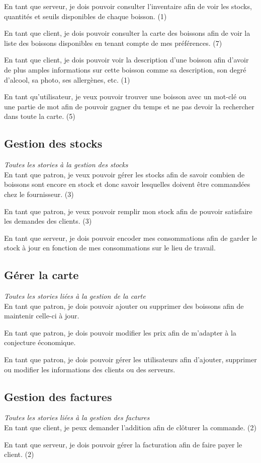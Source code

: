 \documentclass[10pt, a4, oneside, headings=normal]{scrartcl}
\begin{document}
En tant que serveur, je dois pouvoir consulter l'inventaire afin de voir les stocks, quantités et seuils disponibles de chaque boisson. (1)

En tant que client, je dois pouvoir consulter la carte des boissons afin de voir la liste des boissons disponibles en tenant compte de mes préférences. (7)

En tant que client, je dois pouvoir voir la description d'une boisson afin d'avoir de plus amples informations sur cette boisson comme sa description, son degré d'alcool, sa photo, ses allergènes, etc. (1)

En tant qu'utilisateur, je veux pouvoir trouver une boisson avec un mot-clé ou une partie de mot afin de pouvoir gagner du temps et ne pas devoir la rechercher dans toute la carte. (5)

\subsection{Gestion des stocks}
\emph{Toutes les stories à la gestion des stocks}
\\

En tant que patron, je veux pouvoir gérer les stocks afin de savoir combien de boissons sont encore en stock et donc savoir lesquelles doivent être commandées chez le fournisseur. (3)

En tant que patron, je veux pouvoir remplir mon stock afin de pouvoir satisfaire les demandes des clients. (3)

En tant que serveur, je dois pouvoir encoder mes consommations afin de garder le stock à jour en fonction de mes consommations sur le lieu de travail.

\subsection{Gérer la carte}
\emph{Toutes les stories liées à la gestion de la carte}
\\

En tant que patron, je dois pouvoir ajouter ou supprimer des boissons afin de maintenir celle-ci à jour.

En tant que patron, je dois pouvoir modifier les prix afin de m'adapter à la conjecture économique.

En tant que patron, je dois pouvoir gérer les utilisateurs afin d'ajouter, supprimer ou modifier les informations des clients ou des serveurs.

\subsection{Gestion des factures}
\emph{Toutes les stories liées à la gestion des factures}
\\

En tant que client, je peux demander l'addition afin de clôturer la commande. (2)

En tant que serveur, je dois pouvoir gérer la facturation afin de faire payer le client. (2)
\end{document}
